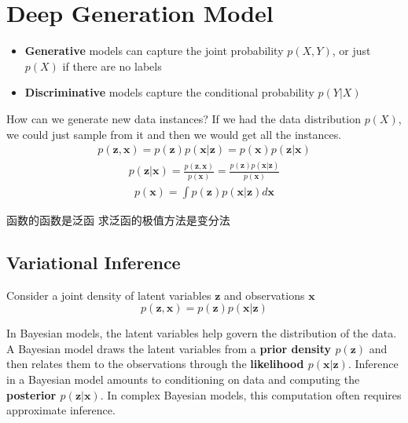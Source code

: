 \chapter{Deep Generation Model}

\begin{itemize}
    \item \textbf{Generative} models can capture the joint probability $p(X, Y)$, or just $p(X)$ if there are no labels
    \item \textbf{Discriminative} models capture the conditional probability $p(Y|X)$
\end{itemize}

How can we generate new data instances? If we had the data distribution $p(X)$, we could just sample
from it and then we would get all the instances.
\begin{equation}
    \begin{split}
        p(\mathbf{z}, \mathbf{x}) = p(\mathbf{z})p(\mathbf{x}|\mathbf{z}) = p(\mathbf{x})p(\mathbf{z}|\mathbf{x})
    \end{split}
\end{equation}
\begin{equation}
    \begin{split}
        p(\mathbf{z}|\mathbf{x}) = \frac{p(\mathbf{z}, \mathbf{x})}{p(\mathbf{x})}
        = \frac{p(\mathbf{z})p(\mathbf{x}|\mathbf{z})}{p(\mathbf{x})}
    \end{split}
\end{equation}
\begin{equation}
    \begin{split}
        p(\mathbf{x}) = \int p(\mathbf{z})p(\mathbf{x}|\mathbf{z})d \mathbf{x}
    \end{split}
\end{equation}

函数的函数是泛函
求泛函的极值方法是变分法

\section{Variational Inference}

Consider a joint density of latent variables $\mathbf{z}$ and observations $\mathbf{x}$
\begin{equation}
    p(\mathbf{z}, \mathbf{x}) = p(\mathbf{z})p(\mathbf{x}|\mathbf{z})
\end{equation}

In Bayesian models, the latent variables help govern the distribution of the data. A Bayesian
model draws the latent variables from a \textbf{prior density $p(\mathbf{z})$} and then relates them to the
observations through the \textbf{likelihood $p(\mathbf{x} | \mathbf{z})$}. Inference in a Bayesian model amounts to
conditioning on data and computing the \textbf{posterior $p(\mathbf{z} | \mathbf{x})$}. In complex Bayesian models,
this computation often requires approximate inference.

